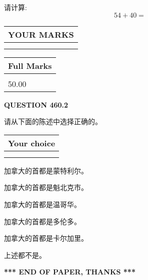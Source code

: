 \documentclass{ctexart}
\begin{document}
  
 
请计算:
\begin{equation}
54 +  %
40 = \nonumber
\end{equation}
 

 

 
  
\vspace{0.2in}
  
\noindent\begin{tabular}{|l|}
\hline
 YOUR MARKS  \\
\hline
 \\ 
 \\ 
\hline
\end{tabular}
\hspace{0.05in} \begin{tabular}{|l|}
\hline
 Full Marks  \\
\hline
 \\ 
50.00 \\
\hline
\end{tabular}
{\textbf{\Large{QUESTION
460.2 
}}}
  
  
请从下面的陈述中选择正确的。
  
  
\noindent\hspace{3.0in} \begin{tabular}{|l|}
\hline
Your choice \\
\hline
 \\ 
 \\ 
\hline
\end{tabular}
  
  
 
 
加拿大的首都是蒙特利尔。
 
 
加拿大的首都是魁北克市。
 
 
加拿大的首都是温哥华。
 
 
加拿大的首都是多伦多。
 
 
加拿大的首都是卡尔加里。
 
 
 上述都不是。
 
 
   
   
 \vspace{0.2in}
 
   
   
   
   
\vspace{1.0in} 
{\textbf{\large{ *** END OF PAPER, THANKS *** }}} 
   
\end{document}
